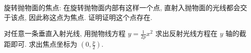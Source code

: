 \begin{question}
  旋转抛物面的焦点: 在旋转抛物面内部有这样一个点, 直射入抛物面的光线都会交于该点, 因此称这点为焦点. 证明证明这个点存在.
\end{question}
\begin{answer}
  对任意一条垂直入射光线, 用抛物线方程 $y=\frac{1}{2p}x^2$ 求出反射光线方程在 $y$ 轴的截距即可. 求出焦点坐标为 $\left( 0,\frac{p}{2} \right)$.
\end{answer}
